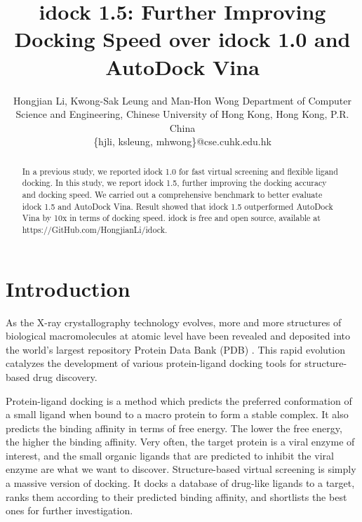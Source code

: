 \documentclass[10pt,conference,compsocconf]{../IEEEtran}
\begin{document}
\title{idock 1.5: Further Improving Docking Speed over idock 1.0 and AutoDock Vina} %
\author
{
\IEEEauthorblockN
{
Hongjian Li, Kwong-Sak Leung and Man-Hon Wong
\IEEEauthorblockA
{
Department of Computer Science and Engineering, Chinese University of Hong Kong, Hong Kong, P.R. China\\
\{hjli, ksleung, mhwong\}@cse.cuhk.edu.hk
}
}
}
\maketitle

\begin{abstract}

In a previous study, we reported idock 1.0 for fast virtual screening and flexible ligand docking. In this study, we report idock 1.5, further improving the docking accuracy and docking speed. We carried out a comprehensive benchmark to better evaluate idock 1.5 and AutoDock Vina. Result showed that idock 1.5 outperformed AutoDock Vina by 10x in terms of docking speed. idock is free and open source, available at https://GitHub.com/HongjianLi/idock.

\end{abstract}

\section{Introduction}

As the X-ray crystallography technology evolves, more and more structures of biological macromolecules at atomic level have been revealed and deposited into the world's largest repository Protein Data Bank (PDB) \cite{539,537}. This rapid evolution catalyzes the development of various protein-ligand docking tools for structure-based drug discovery.

Protein-ligand docking is a method which predicts the preferred conformation of a small ligand when bound to a macro protein to form a stable complex. It also predicts the binding affinity in terms of free energy. The lower the free energy, the higher the binding affinity. Very often, the target protein is a viral enzyme of interest, and the small organic ligands that are predicted to inhibit the viral enzyme are what we want to discover. Structure-based virtual screening is simply a massive version of docking. It docks a database of drug-like ligands to a target, ranks them according to their predicted binding affinity, and shortlists the best ones for further investigation.
\end{document}
